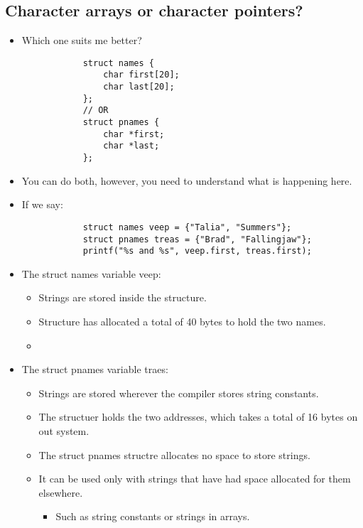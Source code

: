 \subsection{Character arrays or character pointers?}
\begin{itemize}
    \item Which one suits me better?
        \begin{verbatim}
            struct names {
                char first[20];
                char last[20];
            };
            // OR
            struct pnames {
                char *first; 
                char *last;
            };
        \end{verbatim}
    
    \item You can do both, however, you need to understand what is happening here. 
    \item If we say: 
        \begin{verbatim}
            struct names veep = {"Talia", "Summers"};
            struct pnames treas = {"Brad", "Fallingjaw"};
            printf("%s and %s", veep.first, treas.first);
        \end{verbatim}
    
    \item The struct names variable veep:
        \begin{itemize}
            \item Strings are stored inside the structure.
            \item Structure has allocated a total of 40 bytes to hold the two names. 
            \item 
        \end{itemize}
    
    \item The struct pnames variable traes:
        \begin{itemize}
            \item Strings are stored wherever the compiler stores string constants. 
            \item The structuer holds the two addresses, which takes a total of 16 bytes on out system. 
            \item The struct pnames structre allocates no space to store strings.
            \item It can be used only with strings that have had space allocated for them elsewhere.
                \begin{itemize}
                    \item Such as string constants or strings in arrays. 
                \end{itemize}
            

\end{itemize}
\end{itemize}
